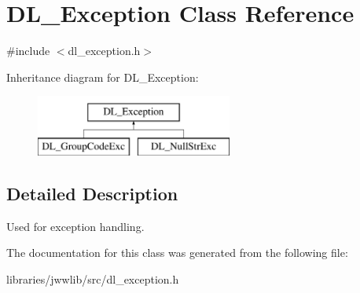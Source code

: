 \hypertarget{classDL__Exception}{\section{D\-L\-\_\-\-Exception Class Reference}
\label{classDL__Exception}
}


{\ttfamily \#include $<$dl\-\_\-exception.\-h$>$}

Inheritance diagram for D\-L\-\_\-\-Exception\-:\begin{figure}[H]
\begin{center}
\leavevmode
\includegraphics[height=2.000000cm]{classDL__Exception}
\end{center}
\end{figure}


\subsection{Detailed Description}
Used for exception handling. 

The documentation for this class was generated from the following file\-:\begin{DoxyCompactItemize}
\item 
libraries/jwwlib/src/dl\-\_\-exception.\-h\end{DoxyCompactItemize}
